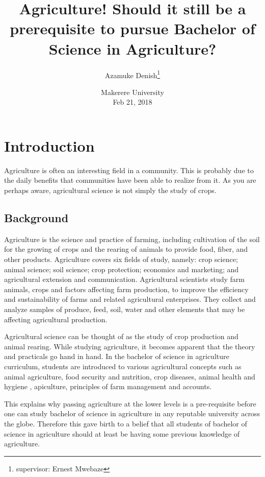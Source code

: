 \documentclass[options]{article}
\title{Agriculture! Should it still be a prerequisite to pursue Bachelor of Science in Agriculture?}
\author{Azamuke Denish\thanks{supervisor: Ernest Mwebaze}}\newpage
\date{%
    Makerere University\\%
    Feb 21, 2018
}
\begin{document}
\begin{titlepage}
\maketitle
\end{titlepage}




\newpage
{} 
\section{\textbf{ Introduction}} 
Agriculture is often an interesting field in a community. This is probably due to the  daily benefits that communities have been able to realize from it. As you are perhaps aware, agricultural science  is not simply the study of crops.


\subsection{\textbf{Background}}
Agriculture is the science and practice of farming, including cultivation of the soil for the growing of crops and the rearing of animals to provide food, fiber, and other products. Agriculture covers six fields of study, namely: crop science; animal science; soil science; crop protection; economics and marketing; and agricultural extension and communication. Agricultural scientists study farm animals, crops and factors affecting farm production, to improve the efficiency and sustainability of farms and related agricultural enterprises. They collect and analyze samples of produce, feed, soil, water and other elements that may be affecting agricultural production.
\bigbreak

Agricultural science can be thought of as the study of crop production and animal rearing. While studying agriculture, it becomes apparent that the theory and practicals go hand in hand. In the bachelor of science in agriculture curriculum, students are introduced to various agricultural concepts such as animal agriculture, food security and nutrition, crop diseases, animal health and hygiene , apiculture, principles of farm management and accounts. \bigbreak

This explains why passing agriculture at the lower levels is a pre-requisite before one can study bachelor of science in agriculture in any reputable university across the globe. Therefore this gave birth to a belief that all students of bachelor of science in agriculture should at least be having some previous knowledge of agriculture. 
\end{document}
